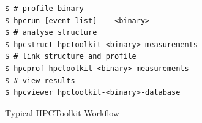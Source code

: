 \documentclass[a4paper, 11pt]{memoir}
\begin{document}
    \begin{listing}[ht]
        \begin{verbatim}
$ # profile binary
$ hpcrun [event list] -- <binary>
$ # analyse structure
$ hpcstruct hpctoolkit-<binary>-measurements
$ # link structure and profile
$ hpcprof hpctoolkit-<binary>-measurements
$ # view results
$ hpcviewer hpctoolkit-<binary>-database
        \end{verbatim}
        \caption{Typical HPCToolkit Workflow}
        \label{lst:hpctoolkit_workflow}
    \end{listing}

    \backmatter
    \printglossaries
    \printbibliography[heading=bibintoc]
\end{document}
